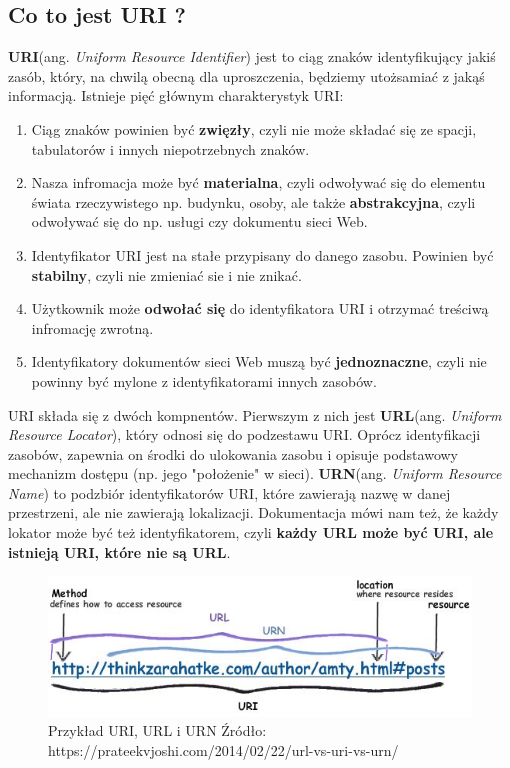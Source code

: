 \documentclass[oneside,polski,logo,indent]{amuthesis}
\begin{document}
\begin{center}
\subsection{Co to jest URI ?}
\end{center}
\textbf{URI}(ang. \emph{Uniform Resource Identifier}) jest to ciąg znaków identyfikujący jakiś zasób, który, na chwilą obecną dla uproszczenia, będziemy utożsamiać z jakąś informacją. Istnieje pięć głównym charakterystyk URI:
\begin{enumerate}
\item Ciąg znaków powinien być \textbf{zwięzły}, czyli nie może składać się ze spacji, tabulatorów i innych niepotrzebnych znaków.\newline
\item Nasza infromacja może być \textbf{materialna}, czyli odwoływać się do elementu świata rzeczywistego np. budynku, osoby, ale także \textbf{abstrakcyjna}, czyli odwoływać się do np. usługi czy dokumentu sieci Web.\newline
\item Identyfikator URI jest na stałe przypisany do danego zasobu. Powinien być \textbf{stabilny}, czyli nie zmieniać sie i nie znikać.\newline
\item Użytkownik może \textbf{odwołać się} do identyfikatora URI i otrzymać treściwą infromację zwrotną.\newline
\item Identyfikatory dokumentów sieci Web muszą być \textbf{jednoznaczne}, czyli nie powinny być mylone z identyfikatorami innych zasobów.\newline
\end{enumerate}
URI składa się z dwóch kompnentów. Pierwszym z nich jest \textbf{URL}(ang. \emph{Uniform Resource Locator}), który odnosi się do podzestawu URI. Oprócz identyfikacji zasobów, zapewnia on środki do ulokowania zasobu i opisuje podstawowy mechanizm dostępu (np. jego "położenie" w sieci). \textbf{URN}(ang. \emph{Uniform Resource Name}) to podzbiór identyfikatorów URI, które zawierają nazwę w danej przestrzeni, ale nie zawierają lokalizacji. Dokumentacja mówi nam też, że każdy lokator może być też identyfikatorem, czyli \textbf{każdy URL może być URI, ale istnieją URI, które nie są URL}.

\begin{figure}[H]
\centering
\includegraphics[width=14cm]{uri.jpg}
\caption{Przykład URI, URL i URN\newline
Źródło: https://prateekvjoshi.com/2014/02/22/url-vs-uri-vs-urn/}
\label{Cache}
\end{figure}
\end{document}

